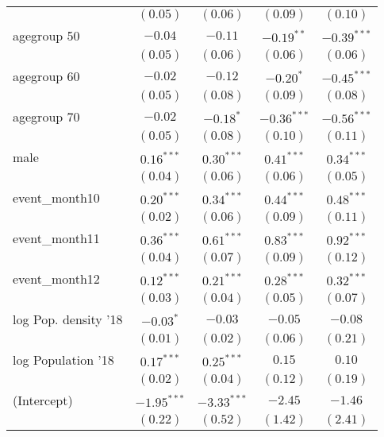 \begin{table}
\begin{center}
\begin{tabular}{l c c c c}
                     & $(0.05)$      & $(0.06)$      & $(0.09)$      & $(0.10)$      \\
agegroup 50          & $-0.04$       & $-0.11$       & $-0.19^{**}$  & $-0.39^{***}$ \\
                     & $(0.05)$      & $(0.06)$      & $(0.06)$      & $(0.06)$      \\
agegroup 60          & $-0.02$       & $-0.12$       & $-0.20^{*}$   & $-0.45^{***}$ \\
                     & $(0.05)$      & $(0.08)$      & $(0.09)$      & $(0.08)$      \\
agegroup 70          & $-0.02$       & $-0.18^{*}$   & $-0.36^{***}$ & $-0.56^{***}$ \\
                     & $(0.05)$      & $(0.08)$      & $(0.10)$      & $(0.11)$      \\
male                 & $0.16^{***}$  & $0.30^{***}$  & $0.41^{***}$  & $0.34^{***}$  \\
                     & $(0.04)$      & $(0.06)$      & $(0.06)$      & $(0.05)$      \\
event\_month10       & $0.20^{***}$  & $0.34^{***}$  & $0.44^{***}$  & $0.48^{***}$  \\
                     & $(0.02)$      & $(0.06)$      & $(0.09)$      & $(0.11)$      \\
event\_month11       & $0.36^{***}$  & $0.61^{***}$  & $0.83^{***}$  & $0.92^{***}$  \\
                     & $(0.04)$      & $(0.07)$      & $(0.09)$      & $(0.12)$      \\
event\_month12       & $0.12^{***}$  & $0.21^{***}$  & $0.28^{***}$  & $0.32^{***}$  \\
                     & $(0.03)$      & $(0.04)$      & $(0.05)$      & $(0.07)$      \\
log Pop. density '18 & $-0.03^{*}$   & $-0.03$       & $-0.05$       & $-0.08$       \\
                     & $(0.01)$      & $(0.02)$      & $(0.06)$      & $(0.21)$      \\
log Population '18   & $0.17^{***}$  & $0.25^{***}$  & $0.15$        & $0.10$        \\
                     & $(0.02)$      & $(0.04)$      & $(0.12)$      & $(0.19)$      \\
(Intercept)          & $-1.95^{***}$ & $-3.33^{***}$ & $-2.45$       & $-1.46$       \\
                     & $(0.22)$      & $(0.52)$      & $(1.42)$      & $(2.41)$      \\

\end{tabular}
\end{center}
\end{table}
